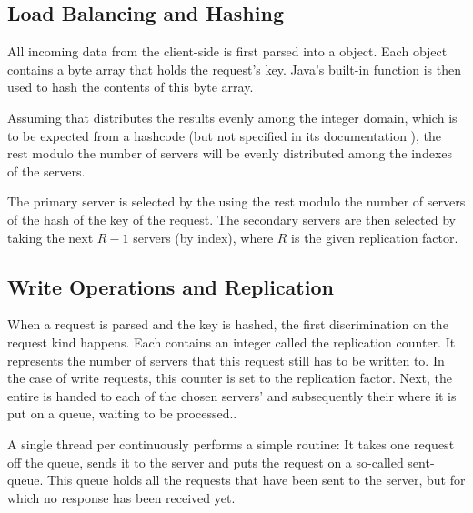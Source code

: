 \documentclass[11pt]{article}
\begin{document}
\subsection{Load Balancing and Hashing}\label{sec:desc:hashing}

% 
All incoming data from the client-side is first parsed into a  object.
Each  object contains a byte array that holds the request's key.
Java's built-in function  is then used to hash the contents of this byte array.

Assuming that  distributes the results evenly among the integer domain, which is to be expected from a hashcode (but not specified in its documentation \cite{javaArrayHash}), the rest modulo the number of servers will be evenly distributed among the indexes of the servers.

The primary server is selected by the using the rest modulo the number of servers of the hash of the key of the request.
The secondary servers are then selected by taking the next $R-1$ servers (by index), where $R$ is the given replication factor.


\subsection{Write Operations and Replication}\label{sec:desc:writes}

% 

When a request is parsed and the key is hashed, the first discrimination on the request kind happens.
Each  contains an integer called the replication counter.
It represents the number of servers that this request still has to be written to.
In the case of write requests, this counter is set to the replication factor.
Next, the entire  is handed to each of the chosen servers'  and subsequently their  where it is put on a queue, waiting to be processed..

A single thread per  continuously performs a simple routine:
It takes one request off the queue, sends it to the server and puts the request on a so-called sent-queue.
This queue holds all the requests that have been sent to the server, but for which no response has been received yet.
\end{document}
